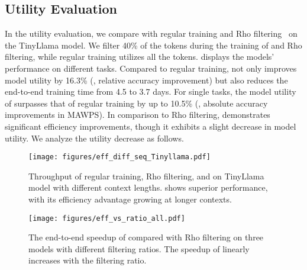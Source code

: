 \subsection{Utility Evaluation} \label{sec:eval:utility}

In the utility evaluation, we compare \solution with regular training and Rho filtering~\cite{RHO} on the TinyLlama model. We filter 40\% of the tokens during the training of \solution and Rho filtering, while regular training utilizes all the tokens.  displays the models' performance on different tasks.
Compared to regular training, \solution not only improves model utility by 16.3\% (\ie, relative accuracy improvement) but also reduces the end-to-end training time from 4.5 to 3.7 days. For single tasks, the model utility of \solution surpasses that of regular training by up to 10.5\% (\eg, absolute accuracy improvements in MAWPS). In comparison to Rho filtering, \solution demonstrates significant efficiency improvements, though it exhibits a slight decrease in model utility. We analyze the utility decrease as follows.


\begin{figure}[t!]
	\centering
	\texttt{[image: figures/eff\_diff\_seq\_Tinyllama.pdf]}
	\caption{Throughput of regular training, Rho filtering, and \solution on TinyLlama model with different context lengths. \solution shows superior performance, with its efficiency advantage growing at longer contexts.}
	\label{fig:eff_diff_seq_Tinyllama}
    \vspace{+2mm}
\end{figure}

\begin{figure}[t!]
	\centering
	\texttt{[image: figures/eff\_vs\_ratio\_all.pdf]}
	\caption{The end-to-end speedup of \solution compared with Rho filtering on three models with different filtering ratios. The speedup of \solution linearly increases with the filtering ratio.} %
	\label{fig:eff_vs_ratio_all}
    \vspace{+2mm}
\end{figure}

